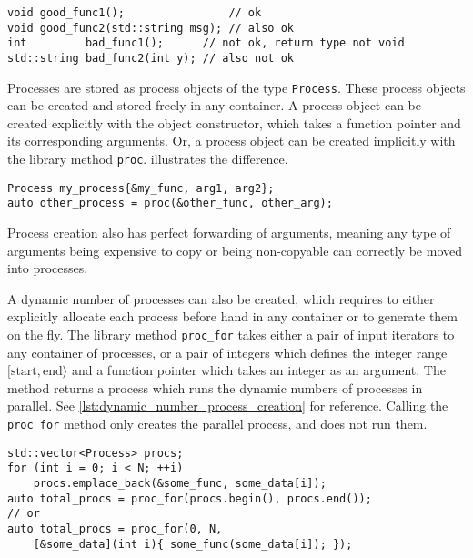\begin{lstfloat}
\begin{lstlisting}[caption={Different function prototypes which do and do not qualify as a process.}, label={lst:code_example_process_func}, style={CustomC++}, xleftmargin={2em}]
void good_func1();                // ok
void good_func2(std::string msg); // also ok
int         bad_func1();      // not ok, return type not void
std::string bad_func2(int y); // also not ok
\end{lstlisting}
\end{lstfloat}

Processes are stored as process objects of the type \lstinline[style={CustomC++}]|Process|. These process objects can be created and stored freely in any container. A process object can be created explicitly with the object constructor, which takes a function pointer and its corresponding arguments. Or, a process object can be created implicitly with the library method \lstinline[style={CustomC++}]|proc|.  illustrates the difference.

\begin{lstfloat}[h!]
\begin{lstlisting}[caption={Process creation.}, label={lst:process_creation}, style={CustomC++}, xleftmargin={2em}]
Process my_process{&my_func, arg1, arg2};
auto other_process = proc(&other_func, other_arg);
\end{lstlisting}
\end{lstfloat}

Process creation also has perfect forwarding of arguments, meaning any type of arguments being expensive to copy or being non\hyp{}copyable can correctly be moved into processes.

A dynamic number of processes can also be created, which requires to either explicitly allocate each process before hand in any container or to generate them on the fly. The library method \lstinline[style={CustomC++}]|proc_for| takes either a pair of input iterators to any container of processes, or a pair of integers which defines the integer range $[\text{start},\text{end}\rangle$ and a function pointer which takes an integer as an argument. The method returns a process which runs the dynamic numbers of processes in parallel. See \cref{lst:dynamic_number_process_creation} for reference. Calling the \lstinline[style={CustomC++}]|proc_for| method only creates the parallel process, and does not run them.

\begin{lstfloat}[h!]
\begin{lstlisting}[caption={Creating a dynamic number of processes.}, label={lst:dynamic_number_process_creation}, style={CustomC++}, xleftmargin={2em}]
std::vector<Process> procs;
for (int i = 0; i < N; ++i) 
    procs.emplace_back(&some_func, some_data[i]);
auto total_procs = proc_for(procs.begin(), procs.end());
// or
auto total_procs = proc_for(0, N,
    [&some_data](int i){ some_func(some_data[i]); });
\end{lstlisting}
\end{lstfloat}

